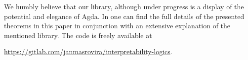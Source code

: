 \documentclass[twoside]{aiml20}
\newcommand{\jan}[1]{\textcolor{orange}{\bf Jan: #1}}
\newcommand{\luka}[1]{\textcolor{blue}{\bf Luka: #1}}
\begin{document}
\begin{itemize}[nosep]
\end{itemize}
We humbly believe that our library, although under progress is
a display of the potential and elegance of Agda. In
\cite{MasRovira:2020:MastersThesis} one can find the full details of the
presented theorems in this paper in conjunction with an extensive explanation of
the mentioned library. The code is freely available at
\begin{center}
\url{https://gitlab.com/janmasrovira/interpretability-logics}.
\end{center}
%
%
\end{document}
